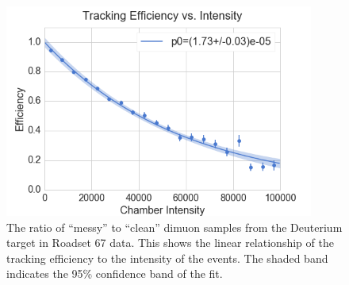 \begin{figure}
	\centering
	\includegraphics[width=4in]{figures/analysis/all-keff-int.png}
	\caption{The ratio of ``messy'' to ``clean'' dimuon samples from the Deuterium target in Roadset 67 data. This shows the linear relationship of the tracking efficiency to the intensity of the events. The shaded band indicates the 95\% confidence band of the fit.}
	\label{fig:keff-all}
\end{figure}

